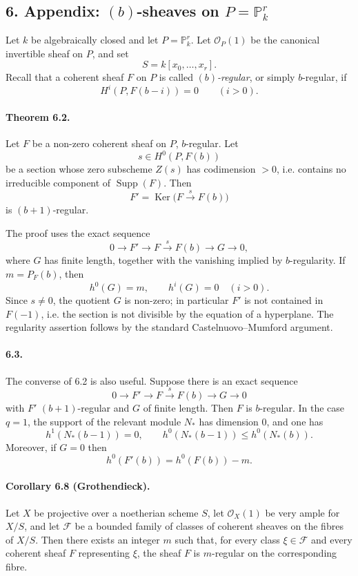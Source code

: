 \documentclass[12pt]{article}
\newcommand{\bP}{\mathbb P}
\newcommand{\cO}{\mathcal O}
\newcommand{\cF}{\mathcal F}
\newcommand{\Supp}{\operatorname{Supp}}
\newcommand{\Ker}{\operatorname{Ker}}
\newcommand{\longto}{\longrightarrow}
\begin{document}
\subsection*{6. Appendix: $(b)$-sheaves on $P=\bP^r_k$}

Let $k$ be algebraically closed and let $P=\bP^r_k$. Let $\cO_P(1)$ be the canonical invertible sheaf on $P$, and set
\[
S=k[x_0,\ldots,x_r].
\]
Recall that a coherent sheaf $F$ on $P$ is called \emph{$(b)$-regular}, or simply $b$-regular, if
\[
H^i(P,F(b-i))=0\qquad (i>0).
\]

\paragraph{Theorem 6.2.}
Let $F$ be a non-zero coherent sheaf on $P$, $b$-regular. Let
\[
s\in H^0(P,F(b))
\]
be a section whose zero subscheme $Z(s)$ has codimension $>0$, i.e. contains no irreducible component of $\Supp(F)$. Then
\[
F'=\Ker\bigl(F\xrightarrow{s}F(b)\bigr)
\]
is $(b+1)$-regular.

The proof uses the exact sequence
\[
0\longto F'\longto F\xrightarrow{s}F(b)\longto G\longto 0,
\]
where $G$ has finite length, together with the vanishing implied by $b$-regularity. If $m=P_F(b)$, then
\[
h^0(G)=m,\qquad h^i(G)=0\quad (i>0).
\]
Since $s\neq 0$, the quotient $G$ is non-zero; in particular $F'$ is not contained in $F(-1)$, i.e. the section is not divisible by the equation of a hyperplane. The regularity assertion follows by the standard Castelnuovo--Mumford argument.

\paragraph{6.3.}
The converse of 6.2 is also useful. Suppose there is an exact sequence
\[
0\longto F'\longto F\xrightarrow{s}F(b)\longto G\longto 0
\]
with $F'$ $(b+1)$-regular and $G$ of finite length. Then $F$ is $b$-regular. In the case $q=1$, the support of the relevant module $N_*$ has dimension $0$, and one has
\[
h^1(N_*(b-1))=0,\qquad h^0(N_*(b-1))\leq h^0(N_*(b)).
\]
Moreover, if $G=0$ then
\[
h^0(F'(b))=h^0(F(b))-m.
\]

\paragraph{Corollary 6.8 (Grothendieck).}
Let $X$ be projective over a noetherian scheme $S$, let $\cO_X(1)$ be very ample for $X/S$, and let $\cF$ be a bounded family of classes of coherent sheaves on the fibres of $X/S$. Then there exists an integer $m$ such that, for every class $\xi\in\cF$ and every coherent sheaf $F$ representing $\xi$, the sheaf $F$ is $m$-regular on the corresponding fibre.
\end{document}
